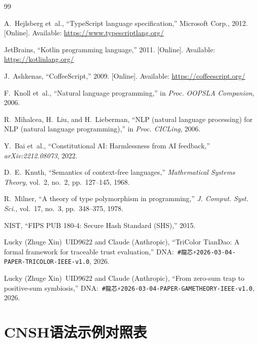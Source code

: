 \documentclass[conference]{IEEEtran}
\begin{document}
\begin{thebibliography}{99}

A.~Hejlsberg et~al.,
``TypeScript language specification,''
Microsoft Corp., 2012.
[Online]. Available: \url{https://www.typescriptlang.org/}

JetBrains,
``Kotlin programming language,'' 2011.
[Online]. Available: \url{https://kotlinlang.org/}

J.~Ashkenas,
``CoffeeScript,'' 2009.
[Online]. Available: \url{https://coffeescript.org/}

F.~Knoll et~al.,
``Natural language programming,''
in \textit{Proc. OOPSLA Companion}, 2006.

R.~Mihalcea, H.~Liu, and H.~Lieberman,
``NLP (natural language processing) for NLP
(natural language programming),''
in \textit{Proc. CICLing}, 2006.

Y.~Bai et~al.,
``Constitutional AI: Harmlessness from AI feedback,''
\textit{arXiv:2212.08073}, 2022.

D.~E.~Knuth,
``Semantics of context-free languages,''
\textit{Mathematical Systems Theory}, vol.~2, no.~2,
pp.~127--145, 1968.

R.~Milner,
``A theory of type polymorphism in programming,''
\textit{J. Comput. Syst. Sci.}, vol.~17, no.~3,
pp.~348--375, 1978.

NIST, ``FIPS PUB 180-4: Secure Hash Standard (SHS),''
2015.

Lucky (Zhuge Xin)~UID9622 and
\textcolor{anthro}{Claude (Anthropic)},
``TriColor TianDao: A formal framework for traceable trust
evaluation,''
DNA:~\texttt{\#龍芯⚡️2026-03-04-PAPER-TRICOLOR-IEEE-v1.0},
2026.

Lucky (Zhuge Xin)~UID9622 and
\textcolor{anthro}{Claude (Anthropic)},
``From zero-sum trap to positive-sum symbiosis,''
DNA:~\texttt{\#龍芯⚡️2026-03-04-PAPER-GAMETHEORY-IEEE-v1.0},
2026.

\end{thebibliography}

\appendix

\section{CNSH语法示例对照表}
\end{document}
